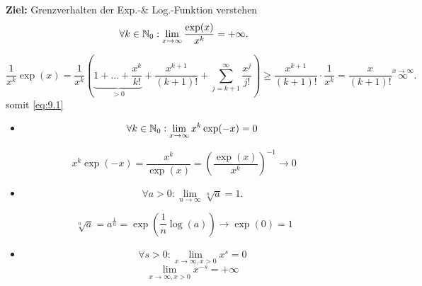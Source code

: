 \textbf{Ziel:} Grenzverhalten der Exp.-\& Log.-Funktion verstehen
\begin{equation}
        \label{eq:9.1}
        \forall k \in \mathbb{N}_0 : \lim_{x \to \infty} \frac{ \exp(x) }{ x^k } = +\infty.
\end{equation}

\[
        \frac{ 1 }{ x^k } \exp(x) = \frac{ 1 }{ x^k } \left( \underbrace{1 + \dotsc + \frac{x^k}{ k! } }_{>0} + \frac{ x^{k+1} }{ (k+1)! } + \sum_{j=k+1}^{\infty} \frac{x^j}{ j! } \right) \geq \frac{x^{k+1}}{ (k+1)! } \cdot \frac{ 1 }{ x^k } = \frac{ x }{ (k+1)! } \overset{x\to \infty}{\infty}.
\]
somit \ref{eq:9.1}
\begin{itemize}
        \item
                \begin{equation}
                        \label{eq:9.2}
                        \forall k \in \mathbb{N}_0 : \lim_{x \to \infty} x^k \exp(-x) = 0
                \end{equation}

\end{itemize}

\[
        x^k \exp(-x) = \frac{x^k}{ \exp(x) } = \left( \frac{ \exp(x) }{ x^k } \right)^{-1} \to 0
\]

\begin{itemize}
        \item
                \begin{equation}
                        \label{eq:9.3}
                        \forall a > 0 : \lim_{n \to \infty} \sqrt[n]{a} = 1.
                \end{equation}
\end{itemize}
\[
        \sqrt[n]{a} = a^{\frac{ 1 }{ n } } = \exp \left( \frac{ 1 }{ n } \log (a) \right) \to \exp (0) = 1
\]
\begin{itemize}
        \item
                \begin{equation*}
                        \forall s >0 : \lim_{x \to \infty, x > 0} x^s = 0
                \end{equation*}
                \begin{equation*}
                        \lim_{x \to \infty, x > 0} x^{-s} = +\infty
                \end{equation*}
\end{itemize}

